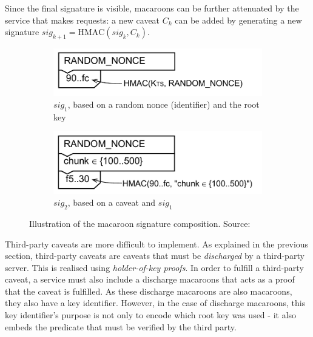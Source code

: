 Since the final signature is visible, macaroons can be further attenuated by the service that makes requests: a new caveat $C_k$ can be added by generating a new signature $sig_{k+1} = \text{HMAC}(sig_k, C_k)$. 

\begin{figure}[H]
     \centering
     \begin{subfigure}[b]{0.45\textwidth}
         \centering
         \includegraphics[width=\textwidth]{images/macaroons/basic-macaroon.png}
         \caption{$sig_1$, based on a random nonce (identifier) and the root key}
         \label{fig:macaroon-sig-1}
     \end{subfigure}
     \hfill
     \begin{subfigure}[b]{0.45\textwidth}
         \centering
         \includegraphics[width=\textwidth]{images/macaroons/macaroon-single-caveat.png}
         \caption{$sig_2$, based on a caveat and $sig_1$}
         \label{fig:macaroon-sig-2}
     \end{subfigure}
        \caption{Illustration of the macaroon signature composition. Source: \citet{macaroons}}
        \label{fig:macaroon-hash-chain}
\end{figure}

\setlength{\abovedisplayskip}{7pt}
\setlength{\belowdisplayskip}{7pt}

\noindent Third-party caveats are more difficult to implement. As explained in the previous section, third-party caveats are caveats that must be \textit{discharged} by a third-party server. This is realised using \textit{holder-of-key proofs}. In order to fulfill a third-party caveat, a service must also include a discharge macaroons that acts as a proof that the caveat is fulfilled. As these discharge macaroons are also macaroons, they also have a key identifier. However, in the case of discharge macaroons, this key identifier's purpose is not only to encode which root key was used - it also embeds the predicate that must be verified by the third party.

